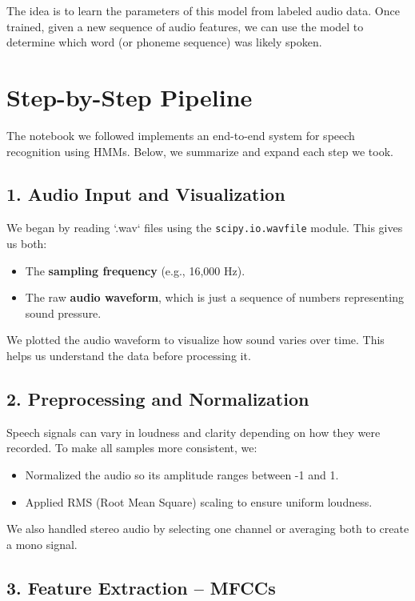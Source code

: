 \documentclass[11pt]{article}
\begin{document}
The idea is to learn the parameters of this model from labeled audio data. Once trained, given a new sequence of audio features, we can use the model to determine which word (or phoneme sequence) was likely spoken.

\section*{Step-by-Step Pipeline}

The notebook we followed implements an end-to-end system for speech recognition using HMMs. Below, we summarize and expand each step we took.

\subsection*{1. Audio Input and Visualization}

We began by reading `.wav` files using the \texttt{scipy.io.wavfile} module. This gives us both:
\begin{itemize}
    \item The \textbf{sampling frequency} (e.g., 16,000 Hz).
    \item The raw \textbf{audio waveform}, which is just a sequence of numbers representing sound pressure.
\end{itemize}

We plotted the audio waveform to visualize how sound varies over time. This helps us understand the data before processing it.

\subsection*{2. Preprocessing and Normalization}

Speech signals can vary in loudness and clarity depending on how they were recorded. To make all samples more consistent, we:
\begin{itemize}
    \item Normalized the audio so its amplitude ranges between -1 and 1.
    \item Applied RMS (Root Mean Square) scaling to ensure uniform loudness.
\end{itemize}

We also handled stereo audio by selecting one channel or averaging both to create a mono signal.

\subsection*{3. Feature Extraction – MFCCs}
\end{document}
